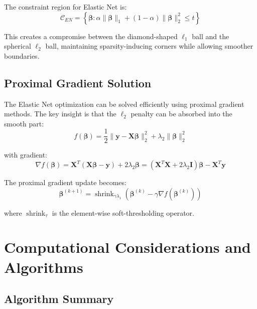 \documentclass[12pt]{article}
\renewcommand{\vec}[1]{\mathbf{#1}}
\DeclareMathOperator{\shrink}{shrink}
\theoremstyle{definition}
\begin{document}
The constraint region for Elastic Net is:
\begin{equation}
    \mathcal{C}_{EN} = \left\{\vec{\beta} : \alpha\|\vec{\beta}\|_1 + (1-\alpha)\|\vec{\beta}\|_2^2 \leq t\right\}
\end{equation}

This creates a compromise between the diamond-shaped $\ell_1$ ball and the spherical $\ell_2$ ball, maintaining sparsity-inducing corners while allowing smoother boundaries.

\subsection{Proximal Gradient Solution}

The Elastic Net optimization can be solved efficiently using proximal gradient methods. The key insight is that the $\ell_2$ penalty can be absorbed into the smooth part:
\begin{equation}
    f(\vec{\beta}) = \frac{1}{2}\|\vec{y} - \vec{X}\vec{\beta}\|_2^2 + \lambda_2\|\vec{\beta}\|_2^2
\end{equation}

with gradient:
\begin{equation}
    \nabla f(\vec{\beta}) = \vec{X}^T(\vec{X}\vec{\beta} - \vec{y}) + 2\lambda_2\vec{\beta} = (\vec{X}^T\vec{X} + 2\lambda_2\vec{I})\vec{\beta} - \vec{X}^T\vec{y}
\end{equation}

The proximal gradient update becomes:
\begin{equation}
    \vec{\beta}^{(k+1)} = \shrink_{\gamma\lambda_1}\left(\vec{\beta}^{(k)} - \gamma\nabla f(\vec{\beta}^{(k)})\right)
\end{equation}

where $\shrink_{\tau}$ is the element-wise soft-thresholding operator.

\newpage

\section{Computational Considerations and Algorithms}

\subsection{Algorithm Summary}
\end{document}
